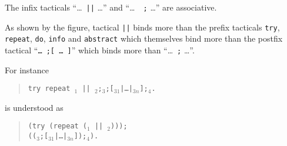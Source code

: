 \begin{Remarks}
\item The infix tacticals ``\dots\ {\tt ||} \dots'' and ``\dots\ {\tt
    ;} \dots'' are associative. 

\item As shown by the figure, tactical {\tt ||} binds more than the
prefix tacticals {\tt try}, {\tt repeat}, {\tt do}, {\tt info} and
{\tt abstract} which themselves bind more than the postfix tactical
``{\tt \dots\ ;[ \dots\ ]}'' which binds more than ``\dots\ {\tt ;}
\dots''.

For instance
\begin{quote}
{\tt try repeat \tac$_1$ ||
  \tac$_2$;\tac$_3$;[\tac$_{31}$|\dots|\tac$_{3n}$];\tac$_4$.}
\end{quote}
is understood as 
\begin{quote}
{\tt (try (repeat (\tac$_1$ || \tac$_2$)));} \\
{\tt ((\tac$_3$;[\tac$_{31}$|\dots|\tac$_{3n}$]);\tac$_4$).}
\end{quote}
\end{Remarks}


